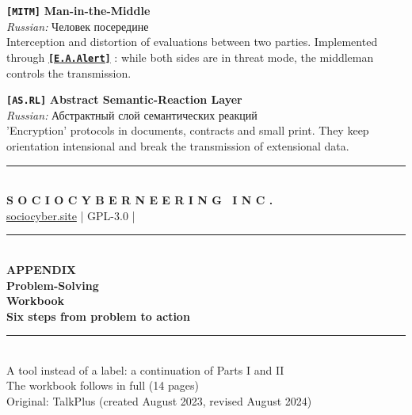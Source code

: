 \documentclass[13pt,a4paper]{article}
\newcommand{\termr}[1]{%
  \hyperref[glossary:#1]{\textbf{\texttt{\textcolor{sce-blue}{[#1]}}}}%
}
\newcommand{\termdef}[1]{\phantomsection\label{glossary:#1}}
\newcommand{\kav}[1]{\textcolor{sce-red}{'#1'}}
\begin{document}
\vspace{0.5em}
\termdef{MITM}
\noindent\textbf{\texttt{[MITM]}} \quad \textbf{Man-in-the-Middle}\\
\textit{Russian:} Человек посередине\\
Interception and distortion of evaluations between two parties. Implemented through \termr{E.A.Alert}: while both sides are in threat mode, the middleman controls the transmission.

\vspace{0.5em}
\termdef{AS.RL}
\noindent\textbf{\texttt{[AS.RL]}} \quad \textbf{Abstract Semantic-Reaction Layer}\\
\textit{Russian:} Абстрактный слой семантических реакций\\
\kav{Encryption} protocols in documents, contracts and small print. They keep orientation intensional and break the transmission of extensional data.

\vspace{3em}
\begin{center}
\textcolor{sce-gold}{\rule{0.5\textwidth}{0.4pt}}\\[0.6em]
{\montserrat\bfseries\small{}\color{sce-black}
S O C I O C Y B E R N E E R I N G \ I N C .}\\[0.2em]
{\footnotesize\color{sce-black}
\href{https://sociocyber.site}{sociocyber.site} \quad|\quad
GPL-3.0 \quad|}
\end{center}

\newpage
{}
{}
\thispagestyle{empty}
\begin{center}
\vspace*{5cm}
\textcolor{sce-gold}{\rule{0.5\textwidth}{0.6pt}}\\[1.2em]
{\montserrat\large\bfseries{}\color{sce-black}APPENDIX}\\[1.2em]
{\montserrat\fontsize{24}{30}\selectfont\bfseries\color{sce-black}Problem-Solving\\Workbook}\\[1.2em]
{\montserrat\normalsize\bfseries\color{sce-grey}Six steps from problem to action}\\[1.4em]
\textcolor{sce-gold}{\rule{0.5\textwidth}{0.6pt}}\\[1.4em]
{\small\color{sce-black}A tool instead of a label: a continuation of Parts I and II\\
The workbook follows in full (14 pages)\\
Original: TalkPlus (created August 2023, revised August 2024)}
\end{center}

\end{document}
